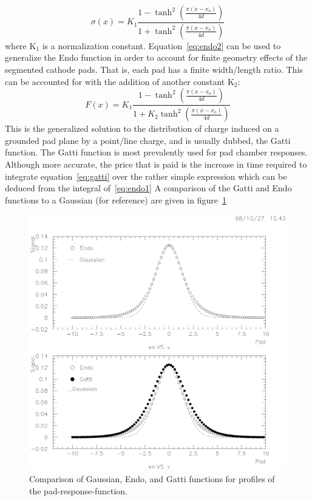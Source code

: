 \documentclass[twoside]{article}
\begin{document}
\begin{equation}
\sigma(x) = K_{1} \frac{1 - \tanh^{2}(\frac{\pi (x-x_{o})}{4 d})}{1 + \tanh^{2}(\frac{\pi (x-x_{o})}{4 d})}
\label{eq:endo2}
\end{equation}
where K$_{1}$ is a normalization constant.  Equation~\ref{eq:endo2}
can be used to generalize the Endo function in order to account for
finite geometry effects of the segmented cathode pads.  That is, each
pad has a finite width/length ratio.  This can be accounted for with
the addition of another constant K$_{2}$:
\begin{equation}
  F(x) = K_{1} \frac{1 - \tanh^{2}(\frac{\pi (x-x_{o})}{4 d})}{1 + K_{2} \tanh^{2}(\frac{\pi (x-x_{o})}{4 d})}
\label{eq:gatti}
\end{equation}
This is the generalized solution to the distribution of
charge induced on a grounded pad plane by a point/line charge,
and is usually dubbed, the Gatti function.  The Gatti function
is most prevalently used for pad chamber responses.  Although
more accurate, the price that is paid is the increase in time
required to integrate equation~\ref{eq:gatti} over the rather
simple expression which can be deduced from the integral of~\ref{eq:endo1}
A comparison of the Gatti and Endo functions to a Gaussian
(for reference) are given in figure~\ref{fig:gatti}
\begin{figure}[htb]
\begin{center}
\includegraphics[bbllx=18pt,bblly=146pt,bburx=563pt,bbury=691pt,width=.55\textwidth]{./pics/prfShape.ps}
\caption{Comparison of Gaussian, Endo, and Gatti functions for profiles
  of the pad-response-function.}
\label{fig:gatti}
\end{center}
\end{figure}
\end{document}

